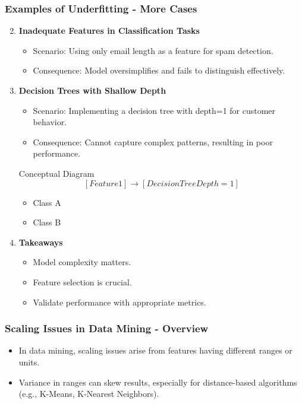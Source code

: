 \documentclass[aspectratio=169]{beamer}
\begin{document}
\begin{frame}[fragile]
    \frametitle{Examples of Underfitting - More Cases}
    \begin{enumerate}
        \setcounter{enumi}{1}
        \item \textbf{Inadequate Features in Classification Tasks}
        \begin{itemize}
            \item Scenario: Using only email length as a feature for spam detection.
            \item Consequence: Model oversimplifies and fails to distinguish effectively.
        \end{itemize}

        \item \textbf{Decision Trees with Shallow Depth}
        \begin{itemize}
            \item Scenario: Implementing a decision tree with depth=1 for customer behavior.
            \item Consequence: Cannot capture complex patterns, resulting in poor performance.
        \end{itemize}
        \begin{block}{Conceptual Diagram}
            \[
            [Feature 1] \rightarrow [Decision Tree Depth=1]
            \]
            \begin{itemize}
                \item Class A
                \item Class B
            \end{itemize}
        \end{block}
        
        \item \textbf{Takeaways}
        \begin{itemize}
            \item Model complexity matters.
            \item Feature selection is crucial.
            \item Validate performance with appropriate metrics.
        \end{itemize}
    \end{enumerate}
\end{frame}

\begin{frame}[fragile]
    \frametitle{Scaling Issues in Data Mining - Overview}
    \begin{itemize}
        \item In data mining, scaling issues arise from features having different ranges or units.
        \item Variance in ranges can skew results, especially for distance-based algorithms (e.g., K-Means, K-Nearest Neighbors).
    \end{itemize}
\end{frame}
\end{document}
